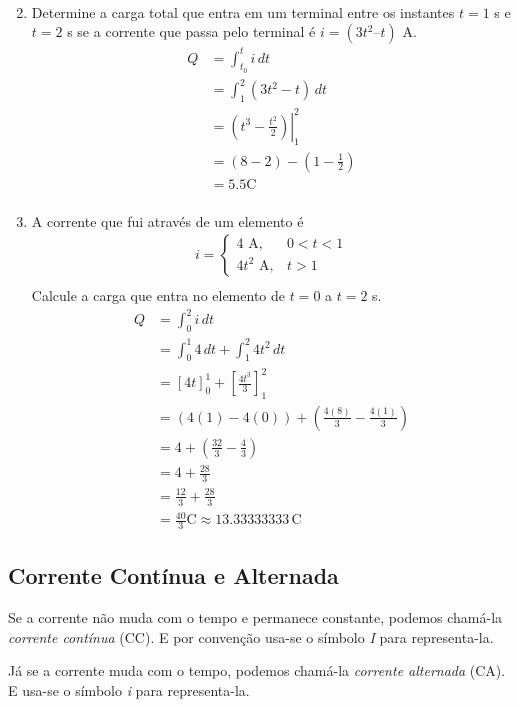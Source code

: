 \begin{enumerate}
\[\begin{aligned}
		      \end{aligned}
	      \]
	\item Determine a carga total que entra em um terminal entre os instantes \( t
	      = 1 \) s e \( t = 2 \) s se a corrente que passa pelo terminal é \( i = (3t^2
	      – t) \) A.
	      \[
		      \begin{aligned}
			      Q & = \int_{t_0}^{t} i\,dt                            \\
			        & = \int_{1}^{2} (3t^2 - t)\,dt                     \\
			        & = \left.\left(t^3-\frac{t^2}{2}\right)\right|_1^2 \\
			        & = (8 - 2) - (1 - \frac{1}{2})                     \\
			        & = 5.5 \text{C}                                    \\
		      \end{aligned}
	      \]
	\item A corrente que fui através de um elemento é
	      \[
		      \begin{aligned}
			      i = \begin{cases}4 \text{~A},     & 0<t<1 \\
             4 t^2 \text{~A}, & t>1\end{cases} \\
		      \end{aligned}
	      \]
	      Calcule a carga que entra no elemento de \( t = 0 \) a \( t = 2 \) s.
	      \[
		      \begin{aligned}
			      Q & = \int_{0}^{2} i\,dt                                           \\
			        & = \int_{0}^{1} 4\,dt + \int_{1}^{2} 4t^2\,dt                   \\
			        & = \left[4t\right]_0^1 + \left[\frac{4t^3}{3}\right]_1^2        \\
			        & = (4(1) - 4(0)) + \left(\frac{4(8)}{3} - \frac{4(1)}{3}\right) \\
			        & = 4 + \left(\frac{32}{3} - \frac{4}{3}\right)                  \\
			        & = 4 + \frac{28}{3}                                             \\
			        & = \frac{12}{3} + \frac{28}{3}                                  \\
			        & = \frac{40}{3} \text{C} \approx 13.33333333 \,\text{C}
		      \end{aligned}
	      \]
\end{enumerate}

\subsection{\textbf{Corrente Contínua e Alternada}}

Se a corrente não muda com o tempo e permanece constante, podemos chamá-la
\textit{corrente contínua} (CC). E por convenção usa-se o símbolo \textit{I}
para representa-la.

Já se a corrente muda com o tempo, podemos chamá-la \textit{corrente alternada}
(CA). E usa-se o símbolo \textit{i} para representa-la.
